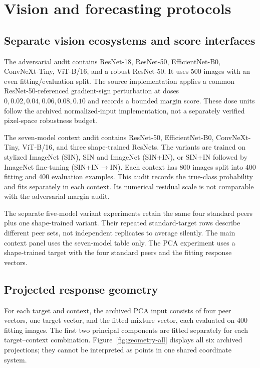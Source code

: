 \section{Vision and forecasting protocols}
\label{app:cross-domain}

\subsection{Separate vision ecosystems and score interfaces}
The adversarial audit contains ResNet-18, ResNet-50, EfficientNet-B0, ConvNeXt-Tiny, ViT-B/16, and a robust ResNet-50. It uses 500 images with an even fitting/evaluation split. The source implementation applies a common ResNet-50-referenced gradient-sign perturbation at doses $0,0.02,0.04,0.06,0.08,0.10$ and records a bounded margin score. These dose units follow the archived normalized-input implementation, not a separately verified pixel-space robustness budget.

The seven-model context audit contains ResNet-50, EfficientNet-B0, ConvNeXt-Tiny, ViT-B/16, and three shape-trained ResNets. The variants are trained on stylized ImageNet (SIN), SIN and ImageNet (SIN+IN), or SIN+IN followed by ImageNet fine-tuning (SIN+IN$\to$IN). Each context has 800 images split into 400 fitting and 400 evaluation examples. This audit records the true-class probability and fits separately in each context. Its numerical residual scale is not comparable with the adversarial margin audit.

The separate five-model variant experiments retain the same four standard peers plus one shape-trained variant. Their repeated standard-target rows describe different peer sets, not independent replicates to average silently. The main context panel uses the seven-model table only. The PCA experiment uses a shape-trained target with the four standard peers and the fitting response vectors.

\subsection{Projected response geometry}
For each target and context, the archived PCA input consists of four peer vectors, one target vector, and the fitted mixture vector, each evaluated on 400 fitting images. The first two principal components are fitted separately for each target--context combination. Figure~\ref{fig:geometry-all} displays all six archived projections; they cannot be interpreted as points in one shared coordinate system.

